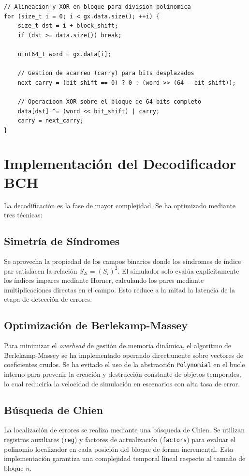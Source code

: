 \begin{lstlisting}[caption={Implementación optimizada de XOR con desplazamiento en bloques de 64 bits.}]
// Alineacion y XOR en bloque para division polinomica
for (size_t i = 0; i < gx.data.size(); ++i) {
    size_t dst = i + block_shift;
    if (dst >= data.size()) break;
    
    uint64_t word = gx.data[i];
    
    // Gestion de acarreo (carry) para bits desplazados
    next_carry = (bit_shift == 0) ? 0 : (word >> (64 - bit_shift));
    
    // Operacioon XOR sobre el bloque de 64 bits completo
    data[dst] ^= (word << bit_shift) | carry;
    carry = next_carry;
}
\end{lstlisting}

\section{Implementación del Decodificador BCH}
La decodificación es la fase de mayor complejidad. Se ha optimizado mediante tres técnicas:

\subsection{Simetría de Síndromes}
Se aprovecha la propiedad de los campos binarios donde los síndromes de índice par satisfacen la relación $S_{2i} = (S_i)^2$. El simulador solo evalúa explícitamente los índices impares mediante Horner, calculando los pares mediante multiplicaciones directas en el campo. Esto reduce a la mitad la latencia de la etapa de detección de errores.

\subsection{Optimización de Berlekamp-Massey}
Para minimizar el \textit{overhead} de gestión de memoria dinámica, el algoritmo de Berlekamp-Massey se ha implementado operando directamente sobre vectores de coeficientes crudos. Se ha evitado el uso de la abstracción \texttt{Polynomial} en el bucle interno para prevenir la creación y destrucción constante de objetos temporales, lo cual reduciría la velocidad de simulación en escenarios con alta tasa de error.

\subsection{Búsqueda de Chien}
La localización de errores se realiza mediante una búsqueda de Chien. Se utilizan registros auxiliares (\texttt{reg}) y factores de actualización (\texttt{factors}) para evaluar el polinomio localizador en cada posición del bloque de forma incremental. Esta implementación garantiza una complejidad temporal lineal respecto al tamaño de bloque $n$.

